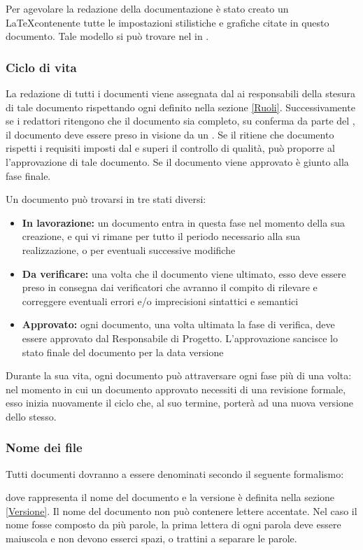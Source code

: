 \documentclass[12pt,a4paper]{article}
\begin{document}
Per agevolare la redazione della documentazione è stato creato un  \LaTeX contenente tutte le impostazioni stilistiche e grafiche citate in questo documento. Tale modello si può trovare nel  in .

\subsubsection{Ciclo di vita}
La redazione di tutti i documenti viene assegnata dal \PM{} ai responsabili della stesura di tale documento rispettando ogni  definito nella sezione \ref{Ruoli}. Successivamente se i redattori ritengono che il documento sia completo, su conferma da parte del \PM, il documento deve essere preso in visione da un \VR. Se il \VR{} ritiene che documento rispetti i requisiti imposti dal \PR{} e superi il controllo di qualità, può proporre al \PM{} l'approvazione di tale documento. Se il documento viene approvato è giunto alla fase finale.

Un documento può trovarsi in tre stati diversi:
\begin{itemize}
	\item \textbf{In lavorazione:} un documento entra in questa fase nel momento della sua creazione, e qui vi rimane per tutto il periodo necessario alla sua realizzazione, o per eventuali successive modifiche
	\item \textbf{Da verificare:} una volta che il documento viene ultimato, esso deve essere preso in consegna dai verificatori che avranno il compito di rilevare e correggere eventuali errori e/o imprecisioni sintattici e semantici
	\item \textbf{Approvato:} ogni documento, una volta ultimata la fase di verifica, deve essere approvato dal Responsabile di Progetto. L’approvazione sancisce lo stato finale del documento per la data versione
\end{itemize}

Durante la sua vita, ogni documento può attraversare ogni fase più di una volta: nel momento in cui un documento approvato necessiti di una revisione formale, esso inizia nuovamente il ciclo che, al suo termine, porterà ad una nuova versione dello stesso.

\subsubsection{Nome dei file}
Tutti documenti dovranno a essere denominati secondo il seguente formalismo:
\begin{center}
\end{center}
dove  rappresenta il nome del documento e  la versione è definita nella sezione \ref{Versione}. Il nome del documento non può contenere lettere accentate. Nel caso il nome fosse composto da più parole, la prima lettera di ogni parola deve essere maiuscola e non devono esserci spazi,  o trattini a separare le parole.
\end{document}
